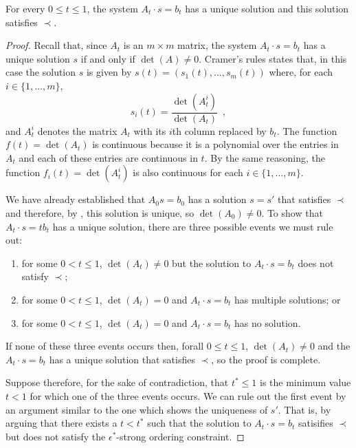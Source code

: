 \documentclass{patmorin}
\begin{document}
\begin{lem}
   For every $0\le t\le 1$, the system $A_t\cdot s=b_t$ has a unique solution
   and this solution satisfies $\prec$.
\end{lem}

\begin{proof}
   Recall that, since $A_t$ is an $m\times m$ matrix, the system $A_t\cdot s=b_t$ 
   has a unique solution $s$ if and
   only if $\det(A)\neq 0$.  Cramer's rules states that, in this case
   the solution $s$ is given by $s(t)=(s_1(t),\ldots,s_m(t))$ where,
   for each $i\in\{1,\ldots,m\}$,
   \[ 
       s_i(t) = \frac{\det(A_t^i)}{\det(A_t)} \enspace ,
   \]
   and $A_t^i$ denotes the matrix $A_t$ with its $i$th column replaced
   by $b_t$. The function $f(t)=\det(A_t)$ is continuous because
   it is a polynomial over the entries in $A_t$ and each of these
   entries are continuous in $t$. By the same reasoning, the function
   $f_i(t)=\det(A_t^i)$ is also continuous for each $i\in\{1,\ldots,m\}$.

   We have already established that $A_0s=b_0$ has a solution $s=s'$
   that satisfies $\prec$ and therefore, by , this
   solution is unique, so $\det(A_0)\neq 0$.  To show that $A_t\cdot s=tb_t$
   has a unique solution, there are three possible events we must rule out:
   \begin{enumerate}
     \item for some $0<t\le 1$, $\det(A_t)\neq 0$ but
           the solution to $A_t\cdot s=b_t$ does not satisfy $\prec$;
     \item for some $0<t\le 1$, $\det(A_t)=0$ and $A_t\cdot s=b_t$ has multiple 
           solutions; or
     \item for some $0<t\le 1$, $\det(A_t)=0$ and $A_t\cdot s=b_t$ has no solution.
   \end{enumerate}
   If none of these three events occurs then, forall $0\le t\le
   1$, $\det(A_t)\neq 0$ and the $A_t\cdot s=b_t$ has a unique solution that
   satisfies $\prec$, so the proof is complete.

   Suppose therefore, for the sake of contradiction, that $t^*\le 1$
   is the minimum value $t<1$ for which one of the three events occurs.
   We can rule out the first event by an argument similar to the one which
   shows the uniqueness of $s'$.  That is, by arguing that there exists
   a $t<t^*$ such that the solution to $A_{t}\cdot s=b_{t}$ satisifies $\prec$
   but does not satisfy the $\epsilon^*$-strong ordering constraint.


\end{proof}
\end{document}

